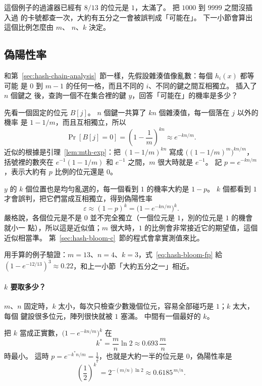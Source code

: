 這個例子的過濾器已經有 $8/13$ 的位元是 $1$，太滿了。 把 $1000$ 到 $9999$ 之間沒插入過
的卡號都查一次，大約有五分之一會被誤判成「可能在」。 下一小節會算出這個比例怎麼由 $m$、
$n$、$k$ 決定。

\subsection{偽陽性率}
\label{sec:hash-bloom-fp}

和第~\ref{sec:hash-chain-analysis}~節一樣，先假設雜湊值像亂數：每個 $h_i(x)$ 都等可能
是 $0$ 到 $m - 1$ 的任何一格，而且不同的 $i$、不同的鍵之間互相獨立。 插入了 $n$ 個鍵之
後，查詢一個不在集合裡的鍵 $y$，回答「可能在」的機率是多少？

先看一個固定的位元 $B[j]$。 $n$ 個鍵一共算了 $kn$ 個雜湊值，每一個落在 $j$ 以外的機率
是 $1 - 1/m$，而且互相獨立，所以
\[
\Pr[B[j] = 0] = \left(1 - \frac{1}{m}\right)^{kn} \approx e^{-kn/m}.
\]
近似的根據是引理~\ref{lem:mth-exp}：把 $(1 - 1/m)^{kn}$ 寫成
$\bigl((1 - 1/m)^m\bigr)^{kn/m}$，括號裡的數夾在 $e^{-1}(1 - 1/m)$ 和 $e^{-1}$ 之間，$m$
很大時就是 $e^{-1}$。 記 $p = e^{-kn/m}$，表示大約有 $p$ 比例的位元還是 $0$。

$y$ 的 $k$ 個位置也是均勻亂選的，每一個看到 $1$ 的機率大約是 $1 - p$。 $k$ 個都看到 $1$
才會誤判，把它們當成互相獨立，得到偽陽性率
\begin{equation}
\label{eq:hash-bloom-fp}
\varepsilon \approx (1 - p)^k = \bigl(1 - e^{-kn/m}\bigr)^k.
\end{equation}
嚴格說，各個位元是不是 $0$ 並不完全獨立（一個位元是 $1$，別的位元是 $1$ 的機會就小一
點），所以這是近似值；$m$ 很大時，$1$ 的比例會非常接近它的期望值，這個近似相當準。
第~\ref{sec:hash-bloom-c}~節的程式會拿實測值來比。

用手算的例子驗證：$m = 13$、$n = 4$、$k = 3$，式~\eqref{eq:hash-bloom-fp} 給
$(1 - e^{-12/13})^3 \approx 0.22$，和上一小節「大約五分之一」相近。

\paragraph{$k$ 要取多少？}
$m$、$n$ 固定時，$k$ 太小，每次只檢查少數幾個位元，容易全部碰巧是 $1$；$k$ 太大，每個
鍵設很多位元，陣列很快就被 $1$ 塞滿。 中間有一個最好的 $k$。

\begin{theorem}
\label{thm:hash-bloom-k}
把 $k$ 當成正實數，$\bigl(1 - e^{-kn/m}\bigr)^k$ 在
\[
k^{*} = \frac{m}{n} \ln 2 \approx 0.693\,\frac{m}{n}
\]
時最小。 這時 $p = e^{-k^{*} n/m} = \frac12$，也就是大約一半的位元是 $0$，偽陽性率是
\[
\left(\frac12\right)^{k^{*}} = 2^{-(m/n)\ln 2} \approx 0.6185^{\,m/n}.
\]
\end{theorem}


